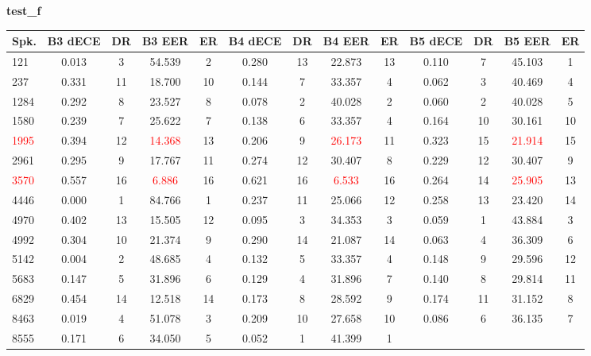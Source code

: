 \documentclass[12pt,leqno,a4paper]{article}
\begin{document}
\begin{table}[H]
\centering
\textbf{test\_f}\\[2pt]
\scriptsize
\setlength{\tabcolsep}{3pt}
\begin{tabular}{lcccccccccccc}
\toprule
\textbf{Spk.}
& \textbf{B3 dECE} & \textbf{DR} & \textbf{B3 EER} & \textbf{ER}
& \textbf{B4 dECE} & \textbf{DR} & \textbf{B4 EER} & \textbf{ER}
& \textbf{B5 dECE} & \textbf{DR} & \textbf{B5 EER} & \textbf{ER} \\
\midrule
121  & 0.013 & 3  & 54.539 & 2  & 0.280 & 13 & 22.873 & 13 
     & 0.110 & 7  & 45.103 & 1  \\
237  & 0.331 & 11 & 18.700 & 10 & 0.144 & 7  & 33.357 & 4  
     & 0.062 & 3  & 40.469 & 4  \\
1284 & 0.292 & 8  & 23.527 & 8  & 0.078 & 2  & 40.028 & 2  
     & 0.060 & 2  & 40.028 & 5  \\
1580 & 0.239 & 7  & 25.622 & 7  & 0.138 & 6  & 33.357 & 4  
     & 0.164 & 10 & 30.161 & 10 \\
\textcolor{red}{1995} 
     & 0.394 & 12 & \textcolor{red}{14.368} & 13 
     & 0.206 & 9  & \textcolor{red}{26.173} & 11 
     & 0.323 & 15 & \textcolor{red}{21.914} & 15 \\
2961 & 0.295 & 9  & 17.767 & 11 & 0.274 & 12 & 30.407 & 8  
     & 0.229 & 12 & 30.407 & 9  \\
\textcolor{red}{3570} 
     & 0.557 & 16 & \textcolor{red}{6.886}  & 16 
     & 0.621 & 16 & \textcolor{red}{6.533}  & 16 
     & 0.264 & 14 & \textcolor{red}{25.905} & 13 \\
4446 & 0.000 & 1  & 84.766 & 1  & 0.237 & 11 & 25.066 & 12 
     & 0.258 & 13 & 23.420 & 14 \\
4970 & 0.402 & 13 & 15.505 & 12 & 0.095 & 3  & 34.353 & 3  
     & 0.059 & 1  & 43.884 & 3  \\
4992 & 0.304 & 10 & 21.374 & 9  & 0.290 & 14 & 21.087 & 14 
     & 0.063 & 4  & 36.309 & 6  \\
5142 & 0.004 & 2  & 48.685 & 4  & 0.132 & 5  & 33.357 & 4  
     & 0.148 & 9  & 29.596 & 12 \\
5683 & 0.147 & 5  & 31.896 & 6  & 0.129 & 4  & 31.896 & 7  
     & 0.140 & 8  & 29.814 & 11 \\
6829 & 0.454 & 14 & 12.518 & 14 & 0.173 & 8  & 28.592 & 9  
     & 0.174 & 11 & 31.152 & 8  \\
8463 & 0.019 & 4  & 51.078 & 3  & 0.209 & 10 & 27.658 & 10 
     & 0.086 & 6  & 36.135 & 7  \\
8555 & 0.171 & 6  & 34.050 & 5  & 0.052 & 1  & 41.399 & 1  

\end{tabular}
\end{table}
\end{document}
